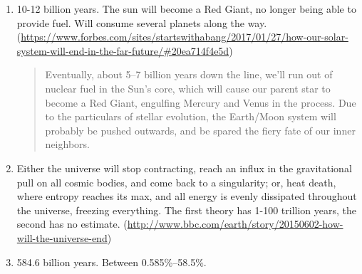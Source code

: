 \documentclass[12pt]{scrartcl}
\begin{document}
\begin{enumerate}[label= (\alph*)]
    \item \num{10}-\num{12} billion years. The sun will become a Red Giant, no longer being able to provide fuel. Will consume several planets along the way. (\url{https://www.forbes.com/sites/startswithabang/2017/01/27/how-our-solar-system-will-end-in-the-far-future/#20ea714f4e5d})

            \begin{quote}
                Eventually, about 5--7 billion years down the line, we’ll run out of nuclear fuel in the Sun’s core, which will cause our parent star to become a Red Giant, engulfing Mercury and Venus in the process. Due to the particulars of stellar evolution, the Earth/Moon system will probably be pushed outwards, and be spared the fiery fate of our inner neighbors.
            \end{quote}

        \item Either the universe will stop contracting, reach an influx in the gravitational pull on all cosmic bodies, and come back to a singularity; or, heat death, where entropy reaches its max, and all energy is evenly dissipated throughout the universe, freezing everything. The first theory has \num{1}-\num{100} trillion years, the second has no estimate. (\url{http://www.bbc.com/earth/story/20150602-how-will-the-universe-end})

        \item \num{584.6} billion years. Between \num{0.585}\%--\num{58.5}\%.
\end{enumerate}
\end{document}
